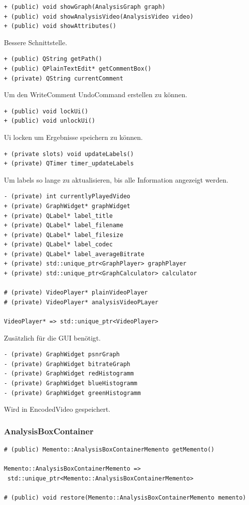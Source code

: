 \documentclass{scrartcl}
\begin{document}
{\begin{verbatim}
+ (public) void showGraph(AnalysisGraph graph)
+ (public) void showAnalysisVideo(AnalysisVideo video)
+ (public) void showAttributes()
\end{verbatim}
Bessere Schnittstelle.
\newpage
\begin{verbatim}
+ (public) QString getPath()
+ (public) QPlainTextEdit* getCommentBox()
+ (private) QString currentComment
\end{verbatim}
Um den WriteComment UndoCommand erstellen zu können.
\bigskip
\begin{verbatim}
+ (public) void lockUi()
+ (public) void unlockUi()
\end{verbatim}
Ui locken um Ergebnisse speichern zu können.
\bigskip
\begin{verbatim}
+ (private slots) void updateLabels()
+ (private) QTimer timer_updateLabels
\end{verbatim}
Um labels so lange zu aktualisieren, bis alle Information angezeigt werden.
\bigskip
\begin{verbatim}
- (private) int currentlyPlayedVideo
+ (private) GraphWidget* graphWidget
+ (private) QLabel* label_title
+ (private) QLabel* label_filename
+ (private) QLabel* label_filesize
+ (private) QLabel* label_codec
+ (private) QLabel* label_averageBitrate
+ (private) std::unique_ptr<GraphPlayer> graphPlayer
+ (private) std::unique_ptr<GraphCalculator> calculator

# (private) VideoPlayer* plainVideoPlayer
# (private) VideoPlayer* analysisVideoPLayer

VideoPlayer* => std::unique_ptr<VideoPlayer>
\end{verbatim}
Zusätzlich für die GUI benötigt.
\bigskip
\begin{verbatim}
- (private) GraphWidget psnrGraph
- (private) GraphWidget bitrateGraph
- (private) GraphWidget redHistogramm
- (private) GraphWidget blueHistogramm
- (private) GraphWidget greenHistogramm
\end{verbatim}
Wird in EncodedVideo gespeichert.
\newpage
\subsubsection{AnalysisBoxContainer}
\bigskip
\begin{verbatim}
# (public) Memento::AnalysisBoxContainerMemento getMemento()

Memento::AnalysisBoxContainerMemento =>
 std::unique_ptr<Memento::AnalysisBoxContainerMemento>

# (public) void restore(Memento::AnalysisBoxContainerMemento memento)


\end{verbatim}}
\end{document}
